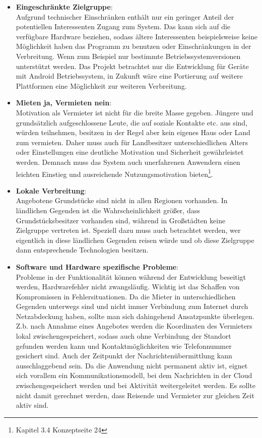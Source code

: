 \begin{itemize}
   \item \textbf{Eingeschränkte Zielgruppe}:\\
   Aufgrund technischer Einschränken enthält nur ein geringer Anteil der potentiellen Interessenten Zugang zum System. Das kann sich auf die verfügbare Hardware beziehen, sodass ältere Interessenten beispielsweise keine Möglichkeit haben das Programm zu benutzen oder Einschränkungen in der Verbreitung. Wenn zum Beispiel nur bestimmte Betriebssystemversionen unterstützt werden. Das Projekt betrachtet nur die Entwicklung für Geräte mit Android Betriebssystem, in Zukunft wäre eine Portierung auf weitere Plattformen eine Möglichkeit zur weiteren Verbreitung.
     
   \item
   \textbf{Mieten ja, Vermieten nein}:\\ Motivation als Vermieter ist nicht für die breite Masse gegeben. Jüngere und grundsätzlich aufgeschlossene Leute, die auf soziale Kontakte etc. aus sind, würden teilnehmen, besitzen in der Regel aber kein eigenes Haus oder Land zum vermieten. Daher muss auch für Landbesitzer unterschiedlichen Alters oder Einstellungen eine deutliche Motivation und Sicherheit gewährleistet werden. Demnach muss das System auch unerfahrenen Anwendern einen leichten Einstieg und ausreichende Nutzungsmotivation bieten\footnote{Kapitel 3.4 Konzeptseite 24}.

   \item
   \textbf{Lokale Verbreitung}:\\ Angebotene Grundstücke sind nicht in allen Regionen vorhanden. In ländlichen Gegenden ist die Wahrscheinlichkeit größer, dass Grundstücksbesitzer vorhanden sind, während in Großstädten keine Zielgruppe vertreten ist. Speziell dazu muss auch betrachtet werden, wer eigentlich in diese ländlichen Gegenden reisen würde und ob diese Zielgruppe dann entsprechende Technologien besitzen.

   \item
   \textbf{Software und Hardware spezifische Probleme}:\\
   Probleme in der Funktionalität können während der Entwicklung beseitigt werden, Hardwarefehler nicht zwangsläufig. Wichtig ist das Schaffen von Kompromissen in Fehlersituationen. 
   Da die Mieter in unterschiedlichen Gegenden unterwegs sind und nicht immer Verbindung zum Internet durch Netzabdeckung haben, sollte man sich dahingehend Ansatzpunkte überlegen. Z.b. nach Annahme eines Angebotes werden die Koordinaten des Vermieters lokal zwischengespeichert, sodass auch ohne Verbindung der Standort gefunden werden kann und Kontaktmöglichkeiten wie Telefonnummer gesichert sind. Auch der Zeitpunkt der Nachrichtenübermittlung kann ausschlaggebend sein. Da die Anwendung nicht permanent aktiv ist, eignet sich vorallem ein Kommunikationsmodell, bei dem Nachrichten in der Cloud zwischengespeichert werden und bei Aktivität weitergeleitet werden. Es sollte nicht damit gerechnet werden, dass Reisende und Vermieter zur gleichen Zeit aktiv sind. 

\end{itemize}

